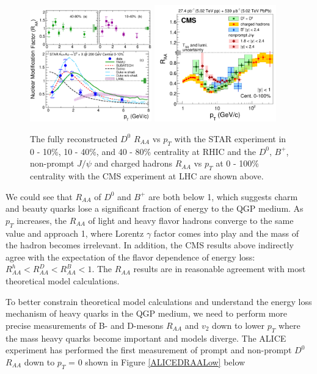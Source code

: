 \begin{figure}[hbtp]
\begin{center}
\includegraphics[width=0.47\textwidth]{Figures/Chapter2/STARRAA.eps}
\includegraphics[width=0.47\textwidth]{Figures/Chapter2/CMSRAA.png}
\caption{The fully reconstructed $D^0$ $R_{AA}$ vs $p_T$ with the STAR experiment in 0 - 10\%, 10 - 40\%, and 40 - 80\% centrality at RHIC and the $D^0$, $B^+$, non-prompt $J/\psi$ and charged hadrons $R_{AA}$ vs $p_T$ at 0 - 100\% centrality with the CMS experiment at LHC are shown above.}
\label{HQRAA}
\end{center}
\end{figure}   

We could see that $R_{AA}$ of $D^0$ and $B^+$ are both below 1, which suggests charm and beauty quarks lose a significant fraction of energy to the QGP medium. As $p_T$ increases, the $R_{AA}$ of light and heavy flavor hadrons converge to the same value and approach 1, where Lorentz $\gamma$ factor comes into play and the mass of the hadron becomes irrelevant. In addition, the CMS results above indirectly agree with the expectation of the flavor dependence of energy loss: $R_{AA}^{h} < R_{AA}^{D} < R_{AA}^{B} < 1$. The $R_{AA}$ results are in reasonable agreement with most theoretical model calculations. 

To better constrain theoretical model calculations and understand the energy loss mechanism of heavy quarks in the QGP medium, we need to perform more precise measurements of B- and D-mesons $R_{AA}$ and $v_2$ down to lower $p_T$ where the mass heavy quarks become important and models diverge. The ALICE experiment has performed the first measurement of prompt and non-prompt $D^0$ $R_{AA}$ down to $p_T$ = 0 shown in Figure \ref{ALICEDRAALow} below


